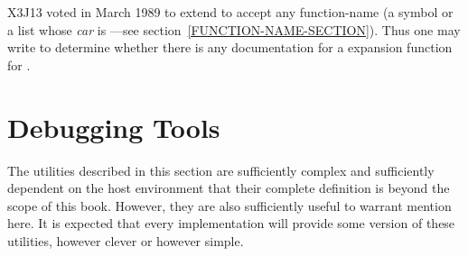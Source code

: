 \begin{newer}
X3J13 voted in March 1989  to extend 
to accept any function-name (a symbol or a list
whose {\it car} is ---see section~\ref{FUNCTION-NAME-SECTION}).
Thus one may write 
to determine whether there is any documentation for a 
expansion function for .
\end{newer}

\section{Debugging Tools}

The utilities described in this section are sufficiently complex
and sufficiently dependent on the host environment that their
complete definition is beyond the scope of this book.
However, they are also sufficiently
useful to warrant mention here.  It is expected that
every implementation will
provide some version of these utilities, however clever or however simple.

